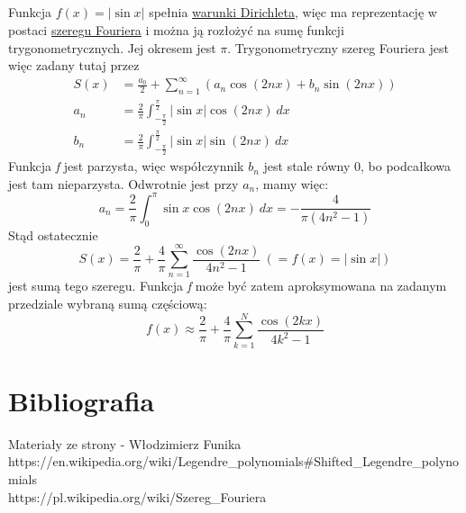 \documentclass{article}
\begin{document}
\subsection{}
Funkcja \(f(x) = |\sin x|\) spełnia \href{https://pl.wikipedia.org/wiki/Warunki_Dirichleta}{warunki Dirichleta}, więc ma reprezentację w postaci \href{https://pl.wikipedia.org/wiki/Szereg_Fouriera}{szeregu Fouriera} i można ją rozłożyć na sumę funkcji trygonometrycznych. Jej okresem jest \(\pi\). Trygonometryczny szereg Fouriera jest więc zadany tutaj przez
\begin{align*}
    S(x) &= \frac{a_0}{2} + \sum_{n=1}^{\infty}( a_n \cos(2nx) + b_n \sin(2nx))\\
    a_n &= \frac{2}{\pi} \int_{-\frac{\pi}{2}}^{\frac{\pi}{2}} |\sin x| \cos(2nx)\ dx\\
    b_n &= \frac{2}{\pi} \int_{-\frac{\pi}{2}}^{\frac{\pi}{2}} |\sin x| \sin(2nx)\ dx
\end{align*}
Funkcja \textit{f} jest parzysta, więc współczynnik \(b_n\) jest stale równy 0, bo podcałkowa jest tam nieparzysta. Odwrotnie jest przy \(a_n\), mamy więc:
\[a_n = \frac{2}{\pi} \int_0^{\pi} \sin x \cos(2nx)\ dx = -\frac{4}{\pi(4n^2 - 1)}\]
Stąd ostatecznie
\[S(x) = \frac{2}{\pi} + \frac{4}{\pi} \sum_{n=1}^{\infty} \frac{\cos(2nx)}{4n^2 - 1}\ (= f(x) = |\sin x|)\]
jest sumą tego szeregu. Funkcja \textit{f} może być zatem aproksymowana na zadanym przedziale wybraną sumą częściową:
\[f(x) \approx \frac{2}{\pi} + \frac{4}{\pi} \sum_{k=1}^{N} \frac{\cos(2kx)}{4k^2 - 1}\]

\section{Bibliografia}
Materiały ze strony - Włodzimierz Funika\\
https://en.wikipedia.org/wiki/Legendre\_polynomials\#Shifted\_Legendre\_polynomials\\
https://pl.wikipedia.org/wiki/Szereg\_Fouriera
\end{document}
